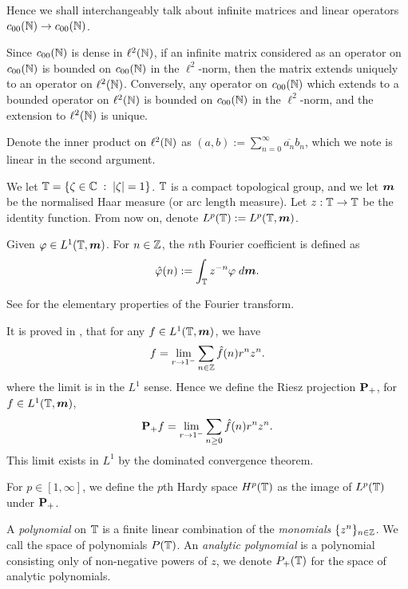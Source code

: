 \documentclass{unswmaths}
\begin{document}
Hence we shall interchangeably talk about infinite matrices and linear
operators $c_{00}(\mathbb{N})\rightarrow c_{00}(\mathbb{N})$.

Since $c_{00}(\mathbb{N})$ is dense in $\ell^2(\mathbb{N})$, if an infinite matrix
considered as an operator on $c_{00}(\mathbb{N})$ is bounded on $c_{00}(\mathbb{N})$
in the $\ell^2$-norm, then the matrix extends uniquely to an operator on $\ell^2(\mathbb{N})$.
Conversely, any operator on $c_{00}(\mathbb{N})$ which extends to a bounded
operator on $\ell^2(\mathbb{N})$ is bounded on $c_{00}(\mathbb{N})$ in the $\ell^2$-norm,
and the extension to $\ell^2(\mathbb{N})$ is unique.

Denote the inner product on $\ell^2(\mathbb{N})$ 
as $(a,b) := \sum_{n=0}^\infty \overline{a_n}b_n$, which we note
is linear in the second argument.

We let $\mathbb{T} = \{\zeta \in \mathbb{C}\;:\; |\zeta| = 1\}$. $\mathbb{T}$ is a compact
topological group, and we let $\boldsymbol{m}$ be the normalised Haar measure (or arc 
length measure). Let $z:\mathbb{T}\rightarrow\mathbb{T}$ be the identity function. 
From now on, denote $L^p(\mathbb{T}) := L^p(\mathbb{T},\boldsymbol{m})$.

Given $\varphi \in L^1(\mathbb{T},\boldsymbol{m})$. For $n \in \mathbb{Z}$, the $n$th Fourier
coefficient is defined as
\begin{equation*}
    \hat{\varphi}(n) := \int_{\mathbb{T}} z^{-n}\varphi\;d\boldsymbol{m}.
\end{equation*}

See \cite{meCesaro} for the elementary properties of the Fourier transform. 

It is proved in \cite{meAbel}, that for any $f \in L^1(\mathbb{T},\boldsymbol{m})$, we have
\begin{equation*}
    f = \lim_{r\rightarrow 1^{-}} \sum_{n \in \mathbb{Z}} \hat{f}(n)r^n z^n.
\end{equation*}
where the limit is in the $L^1$ sense. Hence we define the Riesz projection $\mathbf{P}_+$,
for $f \in L^1(\mathbb{T},\boldsymbol{m})$,
\begin{equation*}
    \mathbf{P}_+ f = \lim_{r\rightarrow 1^-} \sum_{n\geq 0} \hat{f}(n) r^n z^n.
\end{equation*}
This limit exists in $L^1$ by the dominated convergence theorem.

For $p \in [1,\infty]$, we define the $p$th Hardy space $H^p(\mathbb{T})$
as the image of $L^p(\mathbb{T})$ under $\mathbf{P}_+$.

A \emph{polynomial} on $\mathbb{T}$ is a finite linear combination of the \emph{monomials}
$\{z^n\}_{n \in \mathbb{Z}}$. We call the space of polynomials $P(\mathbb{T})$.
An \emph{analytic polynomial} is a polynomial consisting only of non-negative powers
of $z$, we denote $P_+(\mathbb{T})$ for the space of analytic polynomials. 
\end{document}
